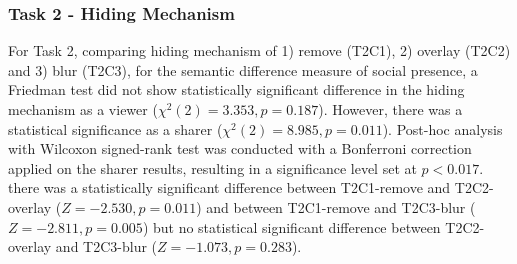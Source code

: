 \subsubsection{Task 2 - Hiding Mechanism}

For Task 2, comparing hiding mechanism of 1) remove (T2C1), 2) overlay (T2C2) and 3) blur (T2C3), for the semantic difference measure of social presence, a Friedman test did not show statistically significant difference in the hiding mechanism as a viewer ($\chi^2(2)=3.353, p=0.187$). However, there was a statistical significance as a sharer ($\chi^2(2)=8.985, p=0.011$). Post-hoc analysis with Wilcoxon signed-rank test was conducted with a Bonferroni correction applied on the sharer results, resulting in a significance level set at $p<0.017$. there was a statistically significant difference between T2C1-remove and T2C2-overlay ($Z=-2.530, p=0.011$) and between T2C1-remove and T2C3-blur ($Z=-2.811, p=0.005$) but no statistical significant difference between T2C2-overlay and T2C3-blur ($Z=-1.073, p=0.283$).


